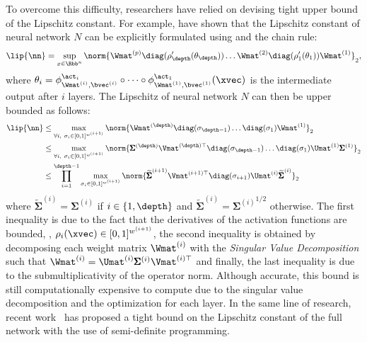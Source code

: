 \noindent
To overcome this difficulty, researchers have relied on devising tight upper bound of the Lipschitz constant.
For example, \citet{scaman2018lipschitz} have shown that the Lipschitz constant of neural network $N$ can be explicitly formulated using  and the chain rule:
\begin{equation}
  \lip{\nn} = \sup_{x \in \Rbb^n} \norm{\Wmat^{(p)} \diag(\rho'_\depth(\theta_\depth)) \dots \Wmat^{(2)} \diag(\rho'_1(\theta_1)) \Wmat^{(1)}}_2,
  \label{equation:ch3-decomposition_jacobian_lipschitz}
\end{equation}
where $\theta_i = \phi^{\act_i}_{\Wmat^{(i)}, \bvec^{(i)}} \circ \cdots \circ \phi^{\act_1}_{\Wmat^{(1)}, \bvec^{(1)}}(\xvec)$ is the intermediate output after $i$ layers.
The Lipschitz of neural network $N$ can then be upper bounded as follows:
\begin{align}
  \lip{\nn} &\leq \max_{\forall i,\ \sigma_i \in [0, 1]^{w^{(i+1)}}} \norm{\Wmat^{(\depth)} \diag(\sigma_{\depth-1}) \dots \diag(\sigma_1) \Wmat^{(1)}}_2 \notag \\
  &\leq \max_{\forall i,\ \sigma_i \in [0, 1]^{w^{(i+1)}}} \norm{ \pmb{\Sigma}^{(\depth)} \Vmat^{(\depth)\top} \diag(\sigma_{\depth-1}) \dots \diag(\sigma_1) \Umat^{(1)} \pmb{\Sigma}^{(1)}}_2 \notag \\
  &\leq \prod_{i=1}^{\depth-1} \max_{\sigma_i \in [0, 1]^{w^{(i+1)}}} \norm{\widetilde{\pmb{\Sigma}}^{(i+1)} \Vmat^{(i+1)\top} \diag(\sigma_{i+1}) \Umat^{(i)} \widetilde{\pmb{\Sigma}}^{(i)}}_2 
\end{align}
where $\widetilde{\pmb{\Sigma}}^{(i)} = \pmb{\Sigma}^{(i)}$ if $i \in \{1, \depth\}$ and $\widetilde{\pmb{\Sigma}}^{(i)} = {\pmb{\Sigma}^{(i)}}^{1/2}$ otherwise.
The first inequality is due to the fact that the derivatives of the activation functions are bounded, \ie, $\rho_i(\xvec) \in [0, 1]^{w^{(i+1)}}$, the second inequality is obtained by decomposing each weight matrix $\Wmat^{(i)}$ with the \emph{Singular Value Decomposition} such that $\Wmat^{(i)} = \Umat^{(i)} \pmb{\Sigma}^{(i)} \Vmat^{(i)\top}$ and finally, the last inequality is due to the submultiplicativity of the operator norm.
Although accurate, this bound is still computationally expensive to compute due to the singular value decomposition and the optimization for each layer. 
In the same line of research, recent work~\cite{fazlyab2019safety,fazlyab2019efficient,latorre2020lipschitz} has proposed a tight bound on the Lipschitz constant of the full network with the use of semi-definite programming.
